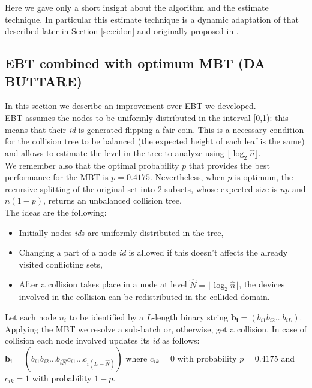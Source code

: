 \documentclass[12pt,a4paper]{report}
\begin{document}
 
Here we gave only a short insight about the algorithm and the estimate technique. In particular this estimate technique is a dynamic adaptation of that described later in Section \ref{se:cidon} and originally proposed in \cite{cidon}.\\

\subsection{EBT combined with optimum MBT (DA BUTTARE)}

In this section we describe an improvement over EBT we developed.\\
EBT assumes the nodes to be uniformly distributed in the interval [0,1): this means that their \emph{id} is generated flipping a fair coin. This is a necessary condition for the collision tree to be balanced (the expected height of each leaf is the same) and allows to estimate the level in the tree to analyze using $\lfloor\log_{2}\hat{n}\rfloor$.\\ We remember also that the optimal probability $p$ that provides the best performance  for the MBT is $p=0.4175$. Nevertheless, when $p$ is optimum, the recursive splitting of the original set into 2 subsets, whose expected size is $np$ and $n(1-p)$, returns an unbalanced collision tree.\\ 

\noindent The ideas are the following: 
\begin{itemize}
\item Initially nodes \emph{id}s are uniformly distributed in the tree,
\item Changing a part of a node \emph{id} is allowed if this doesn't affects the already visited conflicting sets,
\item After a collision takes place in a node at level $\hat{N}=\lfloor\log_{2}\hat{n}\rfloor$, the devices involved in the collision  can be redistributed in the collided domain.
\end{itemize}

Let each node $n_{i}$ to be identified by a $L$-length binary string $\mathbf{b_{i}}=(b_{i1}b_{i2}\ldots b_{iL})$. Applying the MBT we resolve a sub-batch or, otherwise, get a collision. In case of collision each node involved updates its \emph{id} as follows: $\mathbf{b_{i}}=(b_{i1}b_{i2}\ldots b_{i\hat{N}}c_{i1}\ldots c_{i(L-\hat{N})})$ where $c_{ik}=0$ with probability $p=0.4175$ and $c_{ik}=1$ with probability $1-p$.\\  
\end{document}
